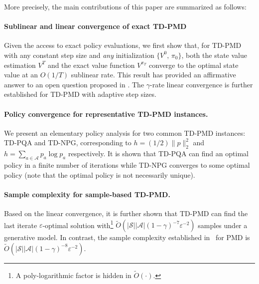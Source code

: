 \documentclass[10pt]{article}
\newcommand{\calA}{\mathcal{A}}
\theoremstyle{plain}
\theoremstyle{definition}
\begin{document}
More precisely, the main contributions of this paper are summarized as follows:

\paragraph{Sublinear  and linear convergence of exact TD-PMD} Given the access to exact policy evaluations,  we first show that, for TD-PMD with any constant step size and \textit{any} initialization $\{ V^0, \, \pi_0 \}$, both  the state value estimation $V^T$ and the exact value function $V^{\pi_T}$  converge to the optimal state value at an $O(1/T)$ sublinear rate.  {This result has provided an affirmative answer to an open question proposed in \cite{Geist_Scherrer_Pietquin_2019}.}
The $\gamma$-rate linear convergence  is further established for TD-PMD with adaptive step sizes. %

\paragraph{Policy convergence for representative TD-PMD instances.} We present an elementary policy analysis for two common TD-PMD instances: TD-PQA and TD-NPG, corresponding to  $h=(1/2)\| p\|_2^2$ and $h=\sum_{a\in\calA} p_a \log p_a$ respectively. It is shown that TD-PQA can find an optimal policy in a finite number of iterations while TD-NPG converges to some optimal policy {(note that the optimal policy is not necessarily unique)}. %

\paragraph{Sample complexity for sample-based TD-PMD.} Based on the linear convergence, it is further shown that  TD-PMD can find the last iterate $\varepsilon$-optimal solution with\footnote{A poly-logarithmic factor is hidden in $\tilde{O}(\cdot)$.} $\tilde{O}(|\mathcal{S}||\mathcal{A}|(1-\gamma)^{-7}\varepsilon^{-2})$ samples under a generative model. In contrast, the sample complexity  established  in~\cite{Xiao_2022,Johnson_Pike-Burke_Rebeschini_2023} for PMD is $\tilde{O}(|\mathcal{S}||\mathcal{A}|(1-\gamma)^{-8}\varepsilon^{-2})$.
\end{document}

